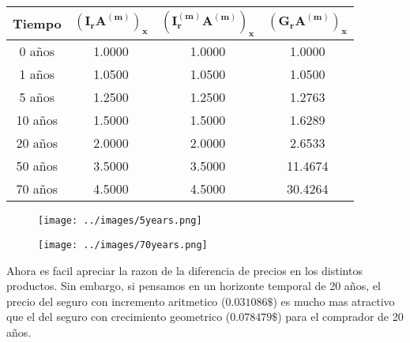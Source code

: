 \begin{center}
    \begin{tabular}{|c|c|c|c|}
        \hline
        \textbf{Tiempo} & $\mathbf{(I_rA^{(m)})_x}$ & $\mathbf{(I^{(m)}_rA^{(m)})_x}$ & $\mathbf{(G_rA^{(m)})_x}$ \\
        \hline
        0 años   & 1.0000 & 1.0000 & 1.0000  \\
        1 años   & 1.0500 & 1.0500 & 1.0500  \\
        5 años   & 1.2500 & 1.2500 & 1.2763  \\
        10 años  & 1.5000 & 1.5000 & 1.6289  \\
        20 años  & 2.0000 & 2.0000 & 2.6533  \\
        50 años  & 3.5000 & 3.5000 & 11.4674 \\
        70 años  & 4.5000 & 4.5000 & 30.4264 \\
        \hline
    \end{tabular}
\end{center}

\begin{figure}[H]
    \centering
    \texttt{[image: ../images/5years.png]}
\end{figure}

\begin{figure}[H]
    \centering
    \texttt{[image: ../images/70years.png]}
\end{figure}

Ahora es facil apreciar la razon de la diferencia de precios en los distintos productos. Sin embargo, si pensamos en un horizonte temporal de 20 años, el precio del seguro con incremento aritmetico ($0.031086\$$) es mucho mas atractivo que el del seguro con crecimiento geometrico ($0.078479\$$) para el comprador de 20 años. 

